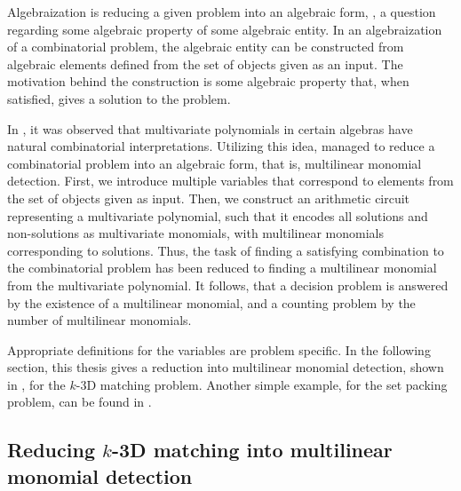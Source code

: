 
Algebraization is reducing a given problem into an algebraic form,
, a
question regarding some algebraic property of some algebraic entity. 
In an algebraization of a combinatorial problem, the algebraic entity can be constructed from algebraic elements defined from the 
set of objects given as an input. The motivation behind the construction is some algebraic property that, 
when satisfied, gives a solution to the problem.

In \cite{Valiant92}, it was observed that multivariate polynomials in certain algebras have natural combinatorial interpretations. 
Utilizing this idea, \cite{Koutis05} managed to reduce a combinatorial problem
into an algebraic form, that is, multilinear monomial detection. 
First, we introduce multiple variables that 
correspond to elements from the set of objects given as input. 
Then, we construct an arithmetic circuit representing a multivariate polynomial, such that it 
encodes all solutions and non-solutions as multivariate monomials, 
with multilinear monomials corresponding to solutions. 
Thus, the task of finding a satisfying combination to the combinatorial problem has been reduced to 
finding a multilinear monomial from the multivariate polynomial.
It follows, that a decision problem is answered by 
the existence of a multilinear monomial, and a counting problem by the number of multilinear monomials.

Appropriate definitions for the variables are problem specific. In the following section, this thesis gives a 
reduction into multilinear monomial detection, shown in \cite{KouWil15}, 
for the $k$-3D matching problem. Another simple example, for the set packing problem, can be found in \cite{Koutis05}.


\subsection{Reducing $k$-3D matching into multilinear monomial detection}

